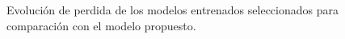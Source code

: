 \documentclass[10pt,letterpaper]{article}
\begin{document}
\begin{figure}[H]
      \begin{center}
        \caption{Evolución de perdida de los modelos entrenados seleccionados para comparación con el modelo propuesto.}
        \label{tif9596}
      \end{center}
\end{figure}
\end{document}
